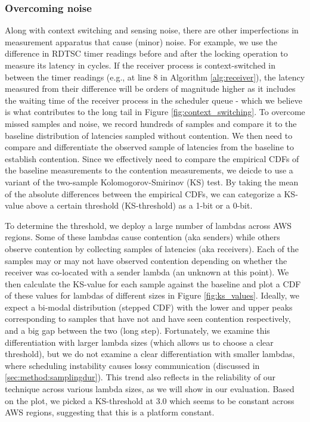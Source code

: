 \subsubsection{Overcoming noise} 
\label{sec:method:noise}
Along with context switching and sensing noise, there are other imperfections in
measurement apparatus that cause (minor) noise. For example, we use the
difference in RDTSC timer readings before and after the
locking operation to measure its latency in
cycles. If the receiver process is context-switched in between the timer
readings (e.g., at line 8 in Algorithm \ref{alg:receiver}), the latency measured
from their difference will be orders of magnitude higher as it includes the
waiting time of the receiver process in the scheduler queue - which we believe
is what contributes to the long tail in Figure \ref{fig:context_switching}. To
overcome missed samples and noise, we record hundreds of samples and compare it
to the baseline distribution of latencies sampled without contention. We then
need to compare and differentiate the observed sample of latencies from the
baseline to establish contention. Since we effectively need to compare the
empirical CDFs of the baseline measurements to the contention measurements, we
deicde to use a variant of the two-sample Kolomogorov-Smirinov (KS) test. By
taking the mean of the absolute differences between the empirical CDFs, we can
categorize a KS-value above a certain threshold (KS-threshold) as a 1-bit or a
0-bit.

To determine the threshold, we deploy a large number of lambdas across AWS
regions. Some of these lambdas cause contention (aka senders) while others
observe contention by collecting samples of latencies (aka receivers). Each of
the samples may or may not have observed contention depending on whether the
receiver was co-located with a sender lambda (an unknown at this point). We then
calculate the KS-value for each sample against the baseline and plot a CDF of
these values for lambdas of different sizes in Figure \ref{fig:ks_values}.
Ideally, we expect a bi-modal distribution (stepped CDF) with the lower and
upper peaks corresponding to samples that have not and have seen contention
respectively, and a big gap between the two (long step). Fortunately, we examine
this differentiation with larger lambda sizes (which allows us to choose a clear
threshold), but we do not examine a clear differentiation with smaller lambdas,
where scheduling instability causes lossy communication (discussed in
\ref{sec:method:samplingdur}).  This trend also reflects in the reliability of
our technique across various lambda sizes, as we will show in our evaluation.
Based on the plot, we picked a KS-threshold at 3.0 which seems to be constant
across AWS regions, suggesting that this is a platform constant.

